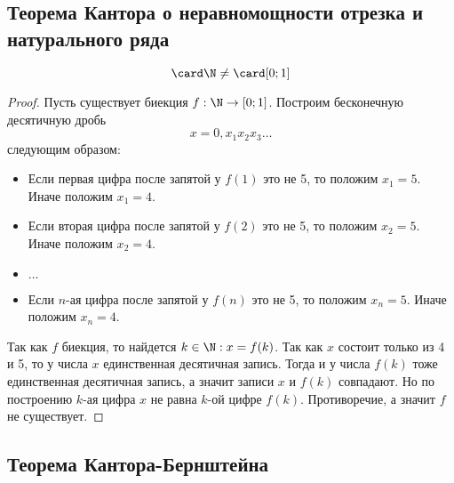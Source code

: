 \documentclass{article}
\begin{document}
\subsection{Теорема Кантора о неравномощности отрезка и натурального ряда}
\begin{theorem}
    \label{th:first-cantor-th}
    \[\card \N \neq \card [0;1]\]
\end{theorem}
\begin{proof}
    Пусть существует биекция \(f: \N \rightarrow [0;1]\). Построим бесконечную десятичную дробь \[x = 0,x_1x_2x_3\ldots\] следующим образом: 
    \begin{itemize}
        \item Если первая цифра после запятой у \(f(1)\) это не 5, то положим \(x_1 = 5\). Иначе положим \(x_1 = 4\).
        \item Если вторая цифра после запятой у \(f(2)\) это не 5, то положим \(x_2 = 5\). Иначе положим \(x_2 = 4\).
        \item \(\ldots\)
        \item Если \(n\)-ая цифра после запятой у \(f(n)\) это не 5, то положим \(x_n = 5\). Иначе положим \(x_n = 4\).
    \end{itemize}
    Так как \(f\) биекция, то найдется \(k \in \N: x = f(k)\). Так как \(x\) состоит только из 4 и 5, то у числа \(x\) единственная десятичная запись. Тогда и у числа \(f(k)\) тоже единственная десятичная запись, а значит записи \(x\) и \(f(k)\) совпадают. Но по построению \(k\)-ая цифра \(x\) не равна \(k\)-ой цифре \(f(k)\). Противоречие, а значит \(f\) не существует.
\end{proof}

\subsection{Теорема Кантора-Бернштейна}
\end{document}
